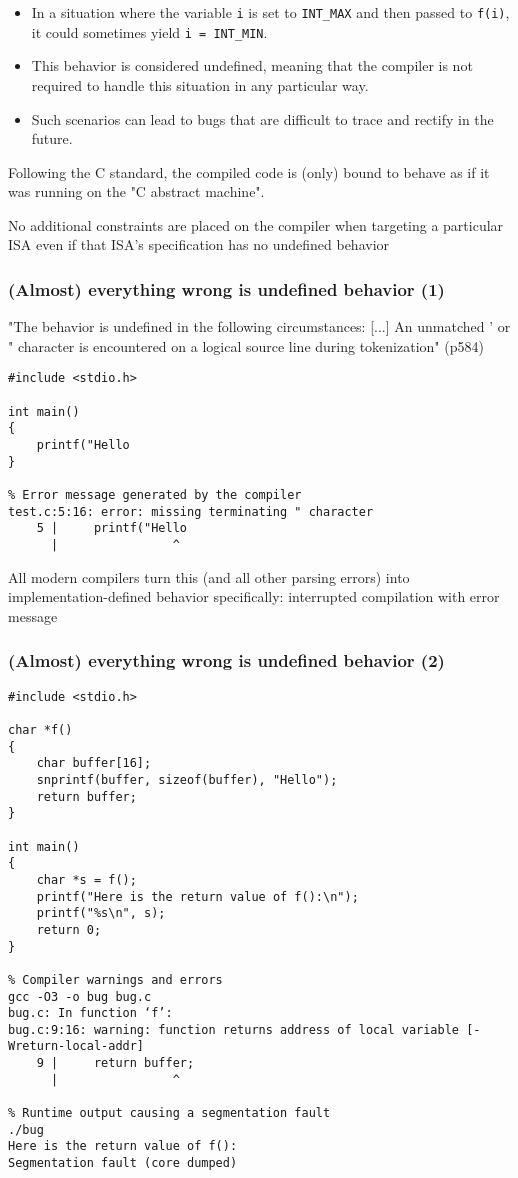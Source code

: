 \documentclass[12pt]{article}
\begin{document}
\begin{itemize}
    \item In a situation where the variable \texttt{i} is set to \texttt{INT\_MAX} and then passed to \texttt{f(i)}, it could sometimes yield \texttt{i = INT\_MIN}.
    \item This behavior is considered undefined, meaning that the compiler is not required to handle this situation in any particular way.
    \item Such scenarios can lead to bugs that are difficult to trace and rectify in the future.
\end{itemize}


Following the C standard, the compiled code is (only) bound to behave as if it was running on the "C abstract machine".

No additional constraints are placed on the compiler when targeting a particular ISA even if that ISA's specification has no undefined behavior

\subsubsection{(Almost) everything wrong is undefined behavior (1)}
"The behavior is undefined in the following circumstances: [...]
An unmatched ' or " character is encountered on a logical source line during tokenization" (p584)

\begin{verbatim}
#include <stdio.h>

int main()
{
    printf("Hello
}

% Error message generated by the compiler
test.c:5:16: error: missing terminating " character
    5 |     printf("Hello
      |                ^
\end{verbatim}

All modern compilers turn this (and all other parsing errors) into implementation-defined behavior specifically: interrupted compilation with error message

\subsubsection{(Almost) everything wrong is undefined behavior (2)}
\begin{verbatim}
#include <stdio.h>

char *f()
{
    char buffer[16]; 
    snprintf(buffer, sizeof(buffer), "Hello");
    return buffer;
}

int main()
{
    char *s = f();
    printf("Here is the return value of f():\n");
    printf("%s\n", s);
    return 0;
}

% Compiler warnings and errors
gcc -O3 -o bug bug.c
bug.c: In function ‘f’:
bug.c:9:16: warning: function returns address of local variable [-Wreturn-local-addr]
    9 |     return buffer;
      |                ^

% Runtime output causing a segmentation fault
./bug
Here is the return value of f():
Segmentation fault (core dumped)
\end{verbatim}
\end{document}
